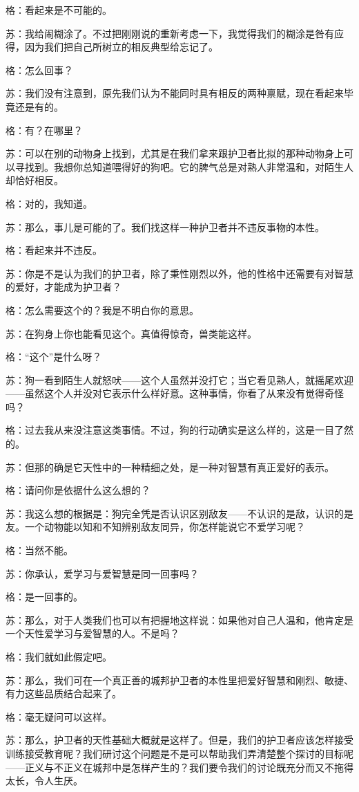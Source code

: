 \documentclass[11pt,oneside]{book}
\begin{document}
\begin{common-format}
格：看起来是不可能的。

苏：我给闹糊涂了。不过把刚刚说的重新考虑一下，我觉得我们的糊涂是咎有应得，因为我们把自己所树立的相反典型给忘记了。

格：怎么回事？

苏：我们没有注意到，原先我们认为不能同时具有相反的两种禀赋，现在看起来毕竟还是有的。

格：有？在哪里？

苏：可以在别的动物身上找到，尤其是在我们拿来跟护卫者比拟的那种动物身上可以寻找到。我想你总知道喂得好的狗吧。它的脾气总是对熟人非常温和，对陌生人却恰好相反。

格：对的，我知道。

苏：那么，事儿是可能的了。我们找这样一种护卫者并不违反事物的本性。

格：看起来并不违反。

苏：你是不是认为我们的护卫者，除了秉性刚烈以外，他的性格中还需要有对智慧的爱好，才能成为护卫者？

格：怎么需要这个的？我是不明白你的意思。

苏：在狗身上你也能看见这个。真值得惊奇，兽类能这样。

格：“这个”是什么呀？

苏：狗一看到陌生人就怒吠——这个人虽然并没打它；当它看见熟人，就摇尾欢迎——虽然这个人并没对它表示什么样好意。这种事情，你看了从来没有觉得奇怪吗？

格：过去我从来没注意这类事情。不过，狗的行动确实是这么样的，这是一目了然的。

苏：但那的确是它天性中的一种精细之处，是一种对智慧有真正爱好的表示。

格：请问你是依据什么这么想的？

苏：我这么想的根据是：狗完全凭是否认识区别敌友——不认识的是敌，认识的是友。一个动物能以知和不知辨别敌友同异，你怎样能说它不爱学习呢？

格：当然不能。

苏：你承认，爱学习与爱智慧是同一回事吗？

格：是一回事的。

苏：那么，对于人类我们也可以有把握地这样说：如果他对自己人温和，他肯定是一个天性爱学习与爱智慧的人。不是吗？

格：我们就如此假定吧。

苏：那么，我们可在一个真正善的城邦护卫者的本性里把爱好智慧和刚烈、敏捷、有力这些品质结合起来了。

格：毫无疑问可以这样。

苏：那么，护卫者的天性基础大概就是这样了。但是，我们的护卫者应该怎样接受训练接受教育呢？我们研讨这个问题是不是可以帮助我们弄清楚整个探讨的目标呢——正义与不正义在城邦中是怎样产生的？我们要令我们的讨论既充分而又不拖得太长，令人生厌。


\end{common-format}
\end{document}
